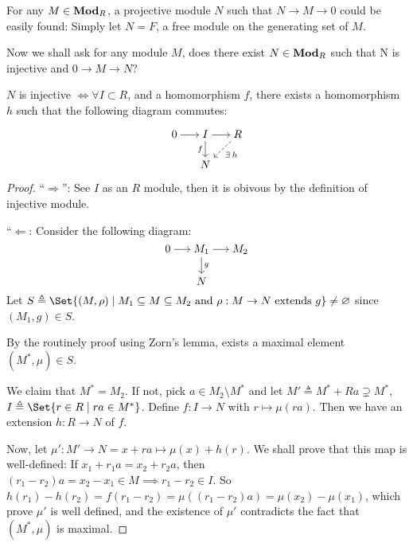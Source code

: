For any $M \in \mathbf{Mod}_R$, a projective module $N$ such that $N \to M \to 0$ could
be easily found: Simply let $N = F$, a free module on the generating set of $M$.

Now we shall ask for any module $M$, does there exist $N \in \mathbf{Mod}_R$ such that
N is injective and $0 \to M \to N$?

\begin{theorem} \label{thm:boers-criterion}
  $N$ is injective $\iff \forall I \subset R$, and a homomorphism
  $f$, there exists a homomorphism $h$
  such that the following diagram commutes:

  \[ \begin{tikzcd}[cramped, sep=15pt]
    0 \ar[r] & I \ar[d, "f"'] \ar[r] & R \ar[dashed, dl, "\exists h"] \\
     & N
    \end{tikzcd}
  \]
  \begin{proof}
    ``$\Rightarrow$'': See $I$ as an $R$ module, then it is obivous by the
    definition of injective module.

    ``$\Leftarrow$: Consider the following diagram:
    \[
      \begin{tikzcd}[cramped, sep=15pt]
      0 \ar[r] & M_1 \ar[d, "g"] \ar[r] & M_2  \\
        & N
      \end{tikzcd}
    \]
    Let $S \triangleq \Set{ (M, \rho) \mid M_1 \subseteq M \subseteq M_2
      \text{ and } \rho : M \to N \text{ extends } g} \neq \varnothing$
    since $(M_1, g) \in S$.

    By the routinely proof using Zorn's lemma, exists a maximal element $(M^*, \mu) \in S$.

    We claim that $M^* = M_2$.
    If not, pick $a \in M_2 \setminus M^*$
    and let $M' \triangleq M^* + Ra \supsetneq M^*$,
    $I \triangleq \Set{ r \in R \mid ra \in M^* }$.
    Define $f : I \to N$ with $r \mapsto \mu(ra)$.
    Then we have an extension $h : R \to N$ of $f$.

    Now, let $\mu' :  M' \to N = x + ra \mapsto \mu(x) + h(r)$.
    We shall prove that this map is well-defined:
    If $x_1 + r_1a = x_2 + r_2a$, then $(r_1 - r_2) a = x_2 - x_1 \in M \implies
    r_1 - r_2 \in I$.
    So $h(r_1) - h(r_2) = f(r_1 - r_2) = \mu((r_1 - r_2)a) = \mu(x_2) - \mu(x_1)$,
    which prove $\mu'$ is well defined, and the existence of $\mu'$
    contradicts the fact that $(M^*, \mu)$ is maximal.
  \end{proof}
\end{theorem}


